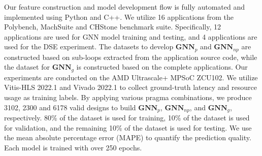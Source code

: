 \documentclass[conference]{IEEEtran}
\begin{document}
Our feature construction and model development flow is fully automated and implemented using Python and C++. We utilize 16 applications from the Polybench, MachSuite and CHStone benchmark suite. Specifically, 12 applications are used for GNN model training and testing, and 4 applications are used for the DSE experiment. The datasets to develop $\textbf{GNN}_p$ and $\textbf{GNN}_{np}$ are constructed based on sub-loops extracted from the application source code, while the dataset for $\textbf{GNN}_g$ is constructed based on the complete applications. Our experiments are conducted on the AMD Ultrascale+ MPSoC ZCU102. %
We utilize Vitis-HLS 2022.1 and Vivado 2022.1 to collect ground-truth latency and resource usage as training labels. By applying various pragma combinations, we produce 3102, 2300 and 6178 valid designs to build \(\textbf{GNN}_p\), \(\textbf{GNN}_{np}\), and \(\textbf{GNN}_g\), respectively. 80\% of the dataset is used for training, 10\% of the dataset is used for validation, and the remaining 10\% of the dataset is used for testing. We use the mean absolute percentage error (MAPE) to quantify the prediction quality. Each model is trained with over 250 epochs.
\end{document}
